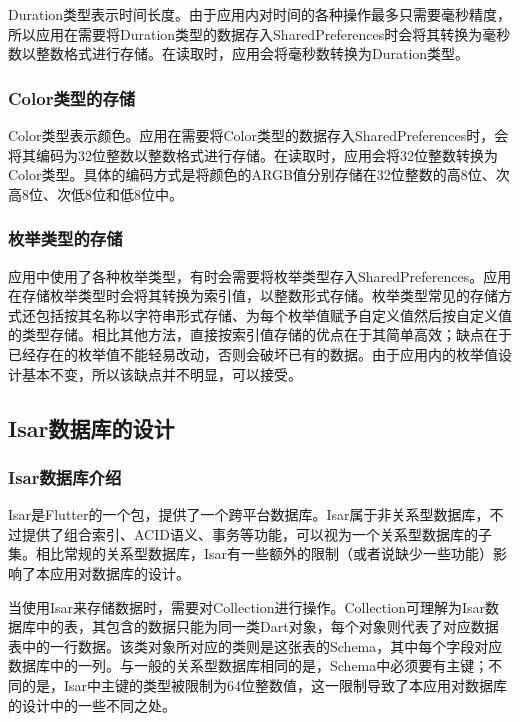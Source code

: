 Duration类型表示时间长度。由于应用内对时间的各种操作最多只需要毫秒精度，所以应用在需要将Duration类型的数据存入SharedPreferences时会将其转换为毫秒数以整数格式进行存储。在读取时，应用会将毫秒数转换为Duration类型。

\subsubsection{Color类型的存储}\label{subsubsec:color-storage}

Color类型表示颜色。应用在需要将Color类型的数据存入SharedPreferences时，会将其编码为32位整数以整数格式进行存储。在读取时，应用会将32位整数转换为Color类型。具体的编码方式是将颜色的ARGB值分别存储在32位整数的高8位、次高8位、次低8位和低8位中。

\subsubsection{枚举类型的存储}\label{subsubsec:enum-storage}

应用中使用了各种枚举类型，有时会需要将枚举类型存入SharedPreferences。应用在存储枚举类型时会将其转换为索引值，以整数形式存储。枚举类型常见的存储方式还包括按其名称以字符串形式存储、为每个枚举值赋予自定义值然后按自定义值的类型存储。相比其他方法，直接按索引值存储的优点在于其简单高效；缺点在于已经存在的枚举值不能轻易改动，否则会破坏已有的数据。由于应用内的枚举值设计基本不变，所以该缺点并不明显，可以接受。

\subsection{Isar数据库的设计}\label{subsec:isar}

\subsubsection{Isar数据库介绍}\label{subsubsec:isar-intro}

Isar是Flutter的一个包，提供了一个跨平台数据库。Isar属于非关系型数据库，不过提供了组合索引、ACID语义、事务等功能，可以视为一个关系型数据库的子集。相比常规的关系型数据库，Isar有一些额外的限制（或者说缺少一些功能）影响了本应用对数据库的设计。

当使用Isar来存储数据时，需要对Collection进行操作。Collection可理解为Isar数据库中的表，其包含的数据只能为同一类Dart对象，每个对象则代表了对应数据表中的一行数据。该类对象所对应的类则是这张表的Schema，其中每个字段对应数据库中的一列。与一般的关系型数据库相同的是，Schema中必须要有主键；不同的是，Isar中主键的类型被限制为64位整数值，这一限制导致了本应用对数据库的设计中的一些不同之处。

